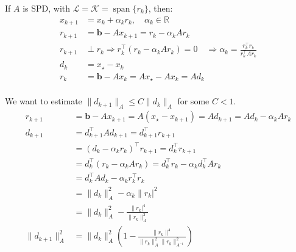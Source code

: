 \begin{example}{}{}
    If $A$ is SPD, with $\mathcal{L} = \mathcal{K} = \operatorname{span}\{r_k\}$, then:
    \begin{align*}
        x_{k+1} & = x_k + \alpha_k r_k, \quad \alpha_k  \in  \mathbb{R}             \\
        r_{k+1} & = \mathbf{b} - A x_{k+1} = r_k - \alpha_k A r_k                   \\
        r_{k+1} & \perp r_k \Rightarrow r_k^{\top} (r_k - \alpha_k A r_k) = 0 \quad
        \Rightarrow \alpha_k = \frac{r_k^{\top} r_k}{r_k^{\top} A r_k}              \\
        d_k     & = x_\star - x_k                                                   \\
        r_k     & = \mathbf{b} - A x_k = A x_\star - A x_k = A d_k                  \\
    \end{align*}

    We want to estimate $\|d_{k+1}\|_A \leq C \|d_k\|_A$ for some $C < 1$.
    \begin{align*}
        r_{k+1}         & = \mathbf{b} - A x_{k+1} = A(x_\star - x_{k+1}) = A d_{k+1} = Ad_k - \alpha_k A r_k \\
        d_{k+1}         & = d_{k+1}^{\top} A d_{k+1} = d_{k+1}^{\top} r_{k+1}                                 \\
                        & = (d_k - \alpha_k r_k)^{\top} r_{k+1} = d_k^{\top} r_{k+1}                          \\
                        & = d_k^{\top} (r_k - \alpha_k A r_k) = d_k^{\top} r_k - \alpha_k d_k^{\top} A r_k    \\
                        & = d_k^{\top} A d_k - \alpha_k r_k^{\top} r_k                                        \\
                        & = \|d_k\|_A^2 - \alpha_k \|r_k|^2                                                   \\
                        & = \|d_k\|_A^2 - \frac{\|r_k|^4}{\|r_k\|_A^2}                                        \\
        \|d_{k+1}\|_A^2 & = \|d_k\|_A^2\left(1 - \frac{\|r_k\|^4}{\|r_k\|_A^2 \|r_k\|_{A^{-1}}^2}\right)
    \end{align*}
\end{example}